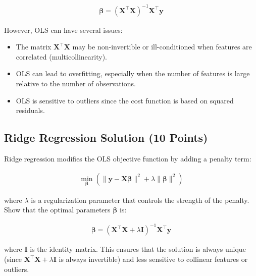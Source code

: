 \documentclass{article}
\begin{document}
\begin{align}
\boldsymbol{\beta} = (\mathbf{X}^\top \mathbf{X})^{-1} \mathbf{X}^\top \mathbf{y}
\end{align}

However, OLS can have several issues:
\begin{itemize}
    \item The matrix $\mathbf{X}^\top \mathbf{X}$ may be non-invertible or ill-conditioned when features are correlated (multicollinearity).
    \item OLS can lead to overfitting, especially when the number of features is large relative to the number of observations.
    \item OLS is sensitive to outliers since the cost function is based on squared residuals.
\end{itemize}

\subsection{Ridge Regression Solution (10 Points)}
Ridge regression modifies the OLS objective function by adding a penalty term:

\begin{align}
\min_{\boldsymbol{\beta}} \left( \|\mathbf{y} - \mathbf{X} \boldsymbol{\beta}\|^2 + \lambda \|\boldsymbol{\beta}\|^2 \right)
\end{align}

where $\lambda$ is a regularization parameter that controls the strength of the penalty. Show that the optimal parameters $\boldsymbol{\beta}$ is:

\begin{align}
\boldsymbol{\beta} = (\mathbf{X}^\top \mathbf{X} + \lambda \mathbf{I})^{-1} \mathbf{X}^\top \mathbf{y}
\end{align}

where $\mathbf{I}$ is the identity matrix. This ensures that the solution is always unique (since $\mathbf{X}^\top \mathbf{X} + \lambda \mathbf{I}$ is always invertible) and less sensitive to collinear features or outliers.
\end{document}

